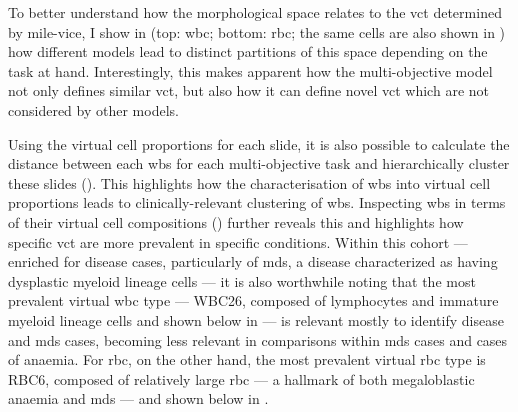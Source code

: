 To better understand how the morphological space relates to the \ac{vct} determined by \ac{mile-vice}, I show in  (top: \ac{wbc}; bottom: \ac{rbc}; the same cells are also shown in ) how different models lead to distinct partitions of this space depending on the task at hand. Interestingly, this makes apparent how the multi-objective model not only defines similar \ac{vct}, but also how it can define novel \ac{vct} which are not considered by other models.

\begin{figure}[!ht]
    \label{fig:u-map-vc-cells}
\end{figure}

Using the virtual cell proportions for each slide, it is also possible to calculate the distance between each \ac{wbs} for each multi-objective task and hierarchically cluster these slides (). This highlights how the characterisation of \ac{wbs} into virtual cell proportions leads to clinically-relevant clustering of \ac{wbs}. Inspecting \ac{wbs} in terms of their virtual cell compositions () further reveals this and highlights how specific \ac{vct} are more prevalent in specific conditions. Within this cohort --- enriched for disease cases, particularly of \ac{mds}, a disease characterized as having dysplastic myeloid lineage cells --- it is also worthwhile noting that the most prevalent virtual \ac{wbc} type --- WBC26, composed of lymphocytes and immature myeloid lineage cells and shown below in  --- is relevant mostly to identify disease and \ac{mds} cases, becoming less relevant in comparisons within \ac{mds} cases and cases of anaemia. For \ac{rbc}, on the other hand, the most prevalent virtual \ac{rbc} type is RBC6, composed of relatively large \ac{rbc} --- a hallmark of both megaloblastic anaemia and \ac{mds} --- and shown below in . 

\begin{figure}[!ht]
    \label{fig:heatmap-slides}
\end{figure}

